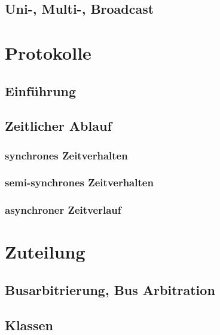 \subsection{Uni-, Multi-, Broadcast}

\section{Protokolle}
\subsection{Einführung}

\subsection{Zeitlicher Ablauf}

\subsubsection{synchrones Zeitverhalten}

\subsubsection{semi-synchrones Zeitverhalten}

\subsubsection{asynchroner Zeitverlauf}

\section{Zuteilung}

\subsection{Busarbitrierung, Bus Arbitration}

\subsection{Klassen}

